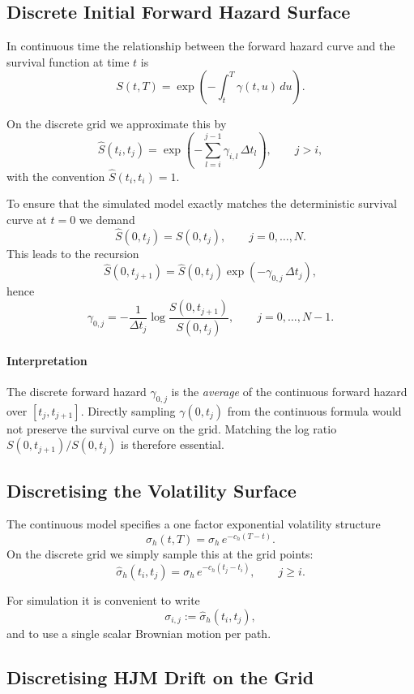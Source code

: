 \subsection{Discrete Initial Forward Hazard Surface}

In continuous time the relationship between the forward hazard curve and the
survival function at time $t$ is
\[
S(t,T)
  = \exp\!\left(-\int_t^T \gamma(t,u)\,du\right).
\]

On the discrete grid we approximate this by
\[
\widehat{S}(t_i, t_j)
  = \exp\!\left(-\sum_{l=i}^{j-1} \gamma_{i,l}\,\Delta t_l\right),
  \qquad j > i,
\]
with the convention $\widehat{S}(t_i, t_i) = 1$.

To ensure that the simulated model exactly matches the deterministic survival
curve at $t = 0$ we demand
\[
\widehat{S}(0, t_j) = S(0, t_j),
\qquad j = 0,\dots,N.
\]
This leads to the recursion
\[
\widehat{S}(0, t_{j+1})
 = \widehat{S}(0, t_j)
   \exp\!\left(-\gamma_{0,j}\,\Delta t_j\right),
\]
hence
\[
\gamma_{0,j}
  = -\frac{1}{\Delta t_j}
     \log\frac{S(0, t_{j+1})}{S(0, t_j)},
  \qquad j = 0,\dots,N-1.
\]

\paragraph{Interpretation}
The discrete forward hazard $\gamma_{0,j}$ is the \emph{average} of the
continuous forward hazard over $[t_j,t_{j+1}]$. Directly sampling
$\gamma(0,t_j)$ from the continuous formula would not preserve the survival
curve on the grid. Matching the log ratio
$S(0,t_{j+1})/S(0,t_j)$ is therefore essential.

\subsection{Discretising the Volatility Surface}

The continuous model specifies a one factor exponential volatility structure
\[
\sigma_h(t,T) = \sigma_h\, e^{-c_h(T - t)}.
\]
On the discrete grid we simply sample this at the grid points:
\[
\widehat{\sigma}_h(t_i, t_j)
  = \sigma_h\, e^{-c_h(t_j - t_i)},
  \qquad j \ge i.
\]

For simulation it is convenient to write
\[
\sigma_{i,j} := \widehat{\sigma}_h(t_i, t_j),
\]
and to use a single scalar Brownian motion per path.

\subsection{Discretising HJM Drift on the Grid}

